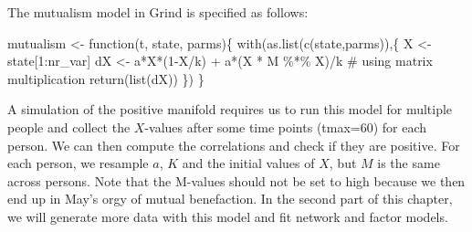 \documentclass[
  letterpaper,
]{scrbook}
\newenvironment{Shaded}{\begin{snugshade}}{\end{snugshade}}
\newcommand{\CommentTok}[1]{\textcolor[rgb]{0.37,0.37,0.37}{#1}}
\newcommand{\ControlFlowTok}[1]{\textcolor[rgb]{0.00,0.23,0.31}{#1}}
\newcommand{\DecValTok}[1]{\textcolor[rgb]{0.68,0.00,0.00}{#1}}
\newcommand{\FunctionTok}[1]{\textcolor[rgb]{0.28,0.35,0.67}{#1}}
\newcommand{\NormalTok}[1]{\textcolor[rgb]{0.00,0.23,0.31}{#1}}
\newcommand{\OtherTok}[1]{\textcolor[rgb]{0.00,0.23,0.31}{#1}}
\newcommand{\SpecialCharTok}[1]{\textcolor[rgb]{0.37,0.37,0.37}{#1}}
\begin{document}
The mutualism model in Grind is specified as follows:

\begin{Shaded}
\begin{Highlighting}[]
\NormalTok{mutualism }\OtherTok{\textless{}{-}} \ControlFlowTok{function}\NormalTok{(t, state, parms)\{}
  \FunctionTok{with}\NormalTok{(}\FunctionTok{as.list}\NormalTok{(}\FunctionTok{c}\NormalTok{(state,parms)),\{}
\NormalTok{    X }\OtherTok{\textless{}{-}}\NormalTok{ state[}\DecValTok{1}\SpecialCharTok{:}\NormalTok{nr\_var]}
\NormalTok{    dX }\OtherTok{\textless{}{-}}\NormalTok{ a}\SpecialCharTok{*}\NormalTok{X}\SpecialCharTok{*}\NormalTok{(}\DecValTok{1}\SpecialCharTok{{-}}\NormalTok{X}\SpecialCharTok{/}\NormalTok{k) }\SpecialCharTok{+}\NormalTok{ a}\SpecialCharTok{*}\NormalTok{(X }\SpecialCharTok{*}\NormalTok{ M }\SpecialCharTok{\%*\%}\NormalTok{ X)}\SpecialCharTok{/}\NormalTok{k }\CommentTok{\# using matrix multiplication}
    \FunctionTok{return}\NormalTok{(}\FunctionTok{list}\NormalTok{(dX))}
\NormalTok{  \})}
\NormalTok{\}}
\end{Highlighting}
\end{Shaded}

A simulation of the positive manifold requires us to run this model for
multiple people and collect the \(X\)-values after some time points
(tmax=60) for each person. We can then compute the correlations and
check if they are positive. For each person, we resample \(a\), \(K\)
and the initial values of \(X\), but \(M\) is the same across persons.
Note that the M-values should not be set to high because we then end up
in May's orgy of mutual benefaction. In the second part of this chapter,
we will generate more data with this model and fit network and factor
models.
\end{document}

